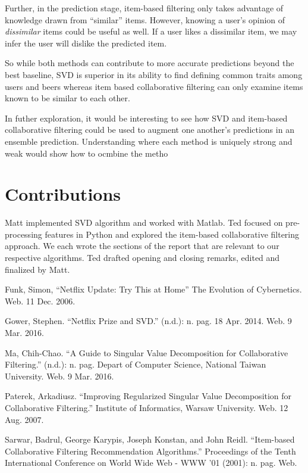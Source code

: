 \documentclass[12pt]{article}
\begin{document}
Further, in the prediction stage, item-based filtering only takes advantage of knowledge drawn from ``similar'' items. However, knowing a user's opinion of \textit{dissimilar} items could be useful as well. If a user likes a dissimilar item, we may infer the user will dislike the predicted item. 

So while both methods can contribute to more accurate predictions beyond the best baseline, SVD is superior in its ability to find defining common traits among users and beers whereas item based collaborative filtering can only examine items known to be similar to each other.

In futher exploration, it would be interesting to see how SVD and item-based collaborative filtering could be used to augment one another's predictions in an ensemble prediction. Understanding where each method is uniquely strong and weak would show how to ocmbine the metho

\section{Contributions}
Matt implemented SVD algorithm and worked with Matlab. Ted focused on pre-processing features in Python and explored the item-based collaborative filtering approach. We each wrote the sections of the report that are relevant to our respective algorithms. Ted drafted opening and closing remarks, edited and finalized by Matt.

\begin{thebibliography}{9}

Funk, Simon, ``Netflix Update: Try This at Home'' The Evolution of Cybernetics. Web. 11 Dec. 2006.

Gower, Stephen. ``Netflix Prize and SVD.'' (n.d.): n. pag. 18 Apr. 2014. Web. 9 Mar. 2016.

Ma, Chih-Chao. ``A Guide to Singular Value Decomposition for Collaborative Filtering.'' (n.d.): n. pag. Depart of Computer Science, National Taiwan University. Web. 9 Mar. 2016.

Paterek, Arkadiusz. ``Improving Regularized Singular Value Decomposition for Collaborative Filtering.'' Institute of Informatics, Warsaw University. Web. 12 Aug. 2007.

Sarwar, Badrul, George Karypis, Joseph Konstan, and John Reidl. ``Item-based Collaborative Filtering Recommendation Algorithms.'' Proceedings of the Tenth International Conference on World Wide Web - WWW '01 (2001): n. pag. Web.

\end{thebibliography}
\end{document}
